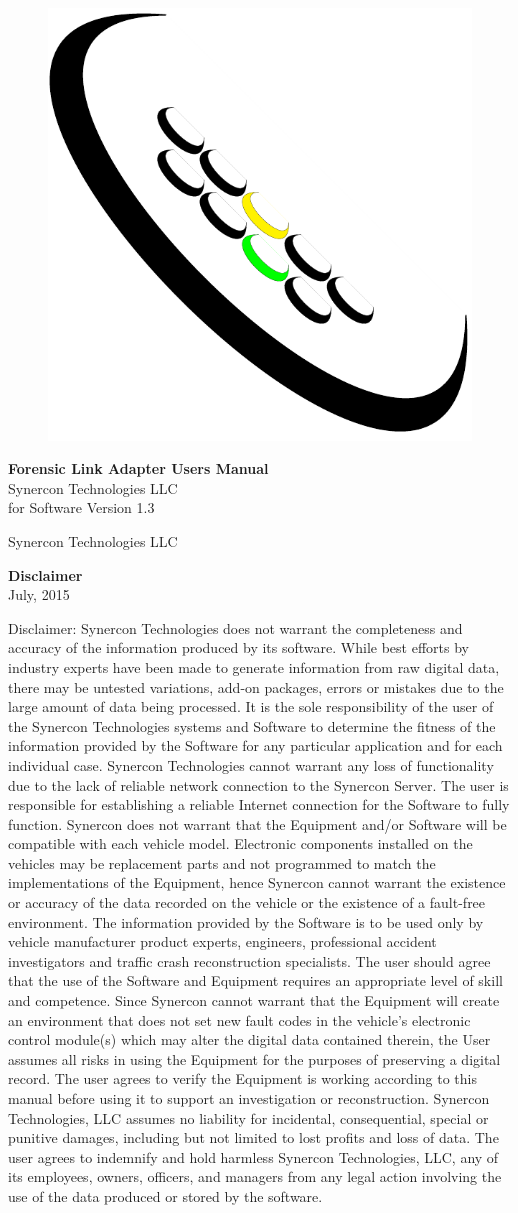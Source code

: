 \documentclass[11pt, oneside]{book}
\newcommand*{\titleGP}{\begingroup %
	\centering %
	\vspace*{\baselineskip} %
	\begin{figure}[tbph] 
		\centering 
		\includegraphics[width=0.25\linewidth]{../media/logos/synercon_logo_v3_only}
		\label{fig:logo}
	\end{figure}
	\vspace{4cm}
	{\Huge \textbf{Forensic Link Adapter Users Manual}}\\[2\baselineskip] %
	{\Huge Synercon Technologies LLC}\\[2\baselineskip]
	{\Large for Software Version 1.3}
	\vfill %
	\textcopyright {\scshape 2016} \\[0.3\baselineskip] %
	\begin{center}
		Synercon Technologies LLC
	\end{center}
\endgroup}
\begin{document}


\pagestyle{newstyle}

\thispagestyle{empty}
\titleGP
\newpage
\frontmatter
\begin{center}
\Large{\textbf{Disclaimer}\\[\baselineskip]}
July, 2015
\end{center}
Disclaimer: Synercon Technologies does not warrant the completeness
and accuracy of the information produced by its software. While best
efforts by industry experts have been made to generate information
from raw digital data, there may be untested variations, add-on packages,
errors or mistakes due to the large amount of data being processed.
It is the sole responsibility of the user of the Synercon Technologies
systems and Software to determine the fitness of the information provided
by the Software for any particular application and for each individual
case. Synercon Technologies cannot warrant any loss of functionality
due to the lack of reliable network connection to the Synercon Server.
The user is responsible for establishing a reliable Internet connection
for the Software to fully function. Synercon does not warrant that
the Equipment and/or Software will be compatible with each vehicle
model. Electronic components installed on the vehicles may be replacement
parts and not programmed to match the implementations of the Equipment,
hence Synercon cannot warrant the existence or accuracy of the data
recorded on the vehicle or the existence of a fault-free environment.
The information provided by the Software is to be used only by vehicle
manufacturer product experts, engineers, professional accident investigators
and traffic crash reconstruction specialists. The user should agree
that the use of the Software and Equipment requires an appropriate
level of skill and competence. Since Synercon cannot warrant that
the Equipment will create an environment that does not set new fault
codes in the vehicle\textquoteright s electronic control module(s)
which may alter the digital data contained therein, the User assumes
all risks in using the Equipment for the purposes of preserving a
digital record. The user agrees to verify the Equipment is working
according to this manual before using it to support an investigation
or reconstruction. Synercon Technologies, LLC assumes no liability
for incidental, consequential, special or punitive damages, including
but not limited to lost profits and loss of data. The user agrees
to indemnify and hold harmless Synercon Technologies, LLC, any of
its employees, owners, officers, and managers from any legal action
involving the use of the data produced or stored by the software.
\newpage
\tableofcontents
\newpage
\mainmatter
\end{document}
